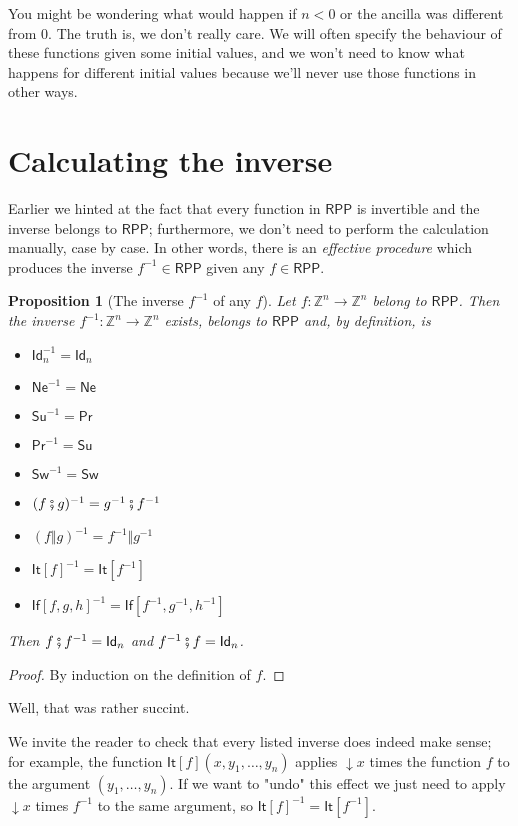 \documentclass{book}
\theoremstyle{definition}
\theoremstyle{remark}
\theoremstyle{plain}
\newtheorem{proposition}{Proposition}
\newcommand{\Z}{\mathbb{Z}}
\newcommand{\RPP}{\mathsf{RPP}}
\newcommand{\rppId}{\mathsf{Id}}
\newcommand{\rppNe}{\mathsf{Ne}}
\newcommand{\rppSu}{\mathsf{Su}}
\newcommand{\rppPr}{\mathsf{Pr}}
\newcommand{\rppSw}{\mathsf{Sw}}
\newcommand{\rppCo}{\fatsemi}
\newcommand{\rppPa}{\Vert}
\newcommand{\rppIt}{\mathsf{It}}
\newcommand{\rppIf}{\mathsf{If}}
\begin{document}
You might be wondering what would happen if $n < 0$ or the ancilla was different from $0$.
The truth is, we don't really care.
We will often specify the behaviour of these functions given some initial values,
and we won't need to know what happens for different initial values because we'll never use those functions in other ways.

\section{Calculating the inverse}

Earlier we hinted at the fact that every function in $\RPP$ is invertible and the inverse belongs to $\RPP$;
furthermore, we don't need to perform the calculation manually, case by case.
In other words, there is an \textit{effective procedure} which produces the inverse $f^{-1} \in \RPP$ given any $f \in \RPP$.

\begin{proposition}[The inverse $f^{-1}$ of any $f$]
\label{rppinv}
Let $f : \Z^n \to \Z^n$ belong to $\RPP$.
Then the inverse $f^{-1} : \Z^n \to \Z^n$ exists, belongs to $\RPP$ and, by definition, is
\begin{itemize}
\item $\rppId_n^{-1} = \rppId_n$
\item $\rppNe^{-1} = \rppNe$
\item $\rppSu^{-1} = \rppPr$
\item $\rppPr^{-1} = \rppSu$
\item $\rppSw^{-1} = \rppSw$
\item $(f \rppCo g)^{-1} = g^{-1} \rppCo f^{-1}$
\item $(f \rppPa g)^{-1} = f^{-1} \rppPa g^{-1}$
\item ${\rppIt[f]}^{-1} = \rppIt[f^{-1}]$
\item ${\rppIf[f, g, h]}^{-1} = \rppIf [f^{-1}, g^{-1}, h^{-1}]$
\end{itemize}
Then $f \rppCo f^{-1} = \rppId_n$ and $f^{-1} \rppCo f = \rppId_n$.
\end{proposition}
\begin{proof}
By induction on the definition of $f$.
\end{proof}

Well, that was rather succint.

We invite the reader to check that every listed inverse does indeed make sense;
for example, the function $\rppIt[f] (x, y_1, \dots, y_n)$ applies $\downarrow x$ times the function $f$ to the argument $(y_1, \dots, y_n)$.
If we want to "undo" this effect we just need to apply $\downarrow x$ times $f^{-1}$ to the same argument, so
${\rppIt[f]}^{-1} = \rppIt[f^{-1}]$.
\end{document}
